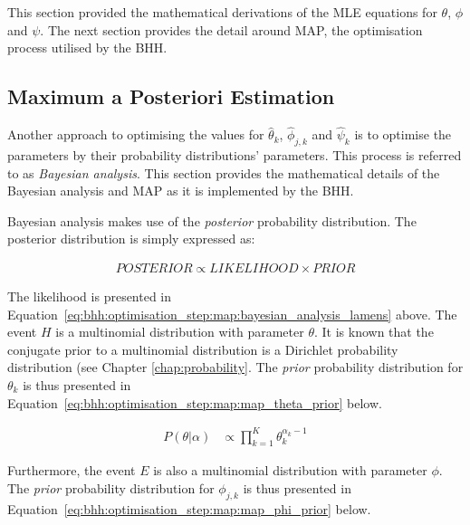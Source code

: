 This section provided the mathematical derivations of the MLE equations for $\theta$, $\phi$ and $\psi$. The next section provides the detail around \ac{MAP}, the optimisation process utilised by the \ac{BHH}.

\subsection{Maximum a Posteriori Estimation}
\label{sec:bhh:optimisation_step:map}

Another approach to optimising the values for $\hat{\theta}_{k}$, $\hat{\phi}_{j,k}$ and $\hat{\psi}_{k}$ is to optimise the parameters by their probability distributions' parameters. This process is referred to as \textit{Bayesian analysis}. This section provides the mathematical details of the Bayesian analysis and \ac{MAP} as it is implemented by the \ac{BHH}.

Bayesian analysis makes use of the \textit{posterior} probability distribution. The posterior distribution is simply expressed as:

\begin{equation*}
      \label{eq:bhh:optimisation_step:map:bayesian_analysis_lamens}
      \begin{split}
            POSTERIOR \propto LIKELIHOOD \times PRIOR
      \end{split}
\end{equation*}

The likelihood is presented in Equation~\eqref{eq:bhh:optimisation_step:map:bayesian_analysis_lamens} above. The event $H$ is a multinomial distribution with parameter $\theta$. It is known that the conjugate prior to a multinomial distribution is a Dirichlet probability distribution (see Chapter \ref{chap:probability}. The \textit{prior} probability distribution for  $\theta_{k}$ is thus presented in Equation~\eqref{eq:bhh:optimisation_step:map:map_theta_prior} below.

\begin{equation}
      \label{eq:bhh:optimisation_step:map:map_theta_prior}
      \begin{split}
            P(\theta | \alpha)
            &\propto \prod_{k=1}^{K} \theta_{k}^{\alpha_{k} -1}
      \end{split}
\end{equation}

Furthermore, the event $E$ is also a multinomial distribution with parameter $\phi$. The \textit{prior} probability distribution for $\phi_{j,k}$ is thus presented in Equation~\eqref{eq:bhh:optimisation_step:map:map_phi_prior} below.

